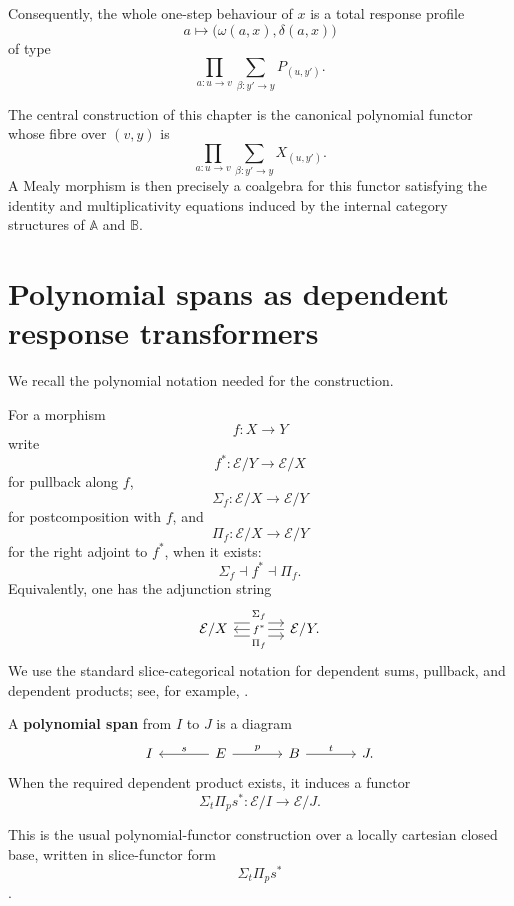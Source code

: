 Consequently, the whole one-step behaviour of \(x\) is a total response
profile
\[
a
\longmapsto
\bigl(\omega(a,x),\delta(a,x)\bigr)
\]
of type
\[
\prod_{a:u\to v}
\sum_{\beta:y'\to y}
P_{(u,y')}.
\]

The central construction of this chapter is the canonical polynomial
functor whose fibre over \((v,y)\) is
\[
\prod_{a:u\to v}
\sum_{\beta:y'\to y}
X_{(u,y')}.
\]
A Mealy morphism is then precisely a coalgebra for this functor satisfying
the identity and multiplicativity equations induced by the internal
category structures of \(\mathbb A\) and \(\mathbb B\).

\section{Polynomial spans as dependent response transformers}
\label{sec:polynomial-spans-dependent-response-transformers}

We recall the polynomial notation needed for the construction.

For a morphism
\[
f:X\to Y
\]
write
\[
f^\ast:\mathcal E/Y\to\mathcal E/X
\]
for pullback along \(f\),
\[
\Sigma_f:\mathcal E/X\to\mathcal E/Y
\]
for postcomposition with \(f\), and
\[
\Pi_f:\mathcal E/X\to\mathcal E/Y
\]
for the right adjoint to \(f^\ast\), when it exists:
\[
\Sigma_f\dashv f^\ast\dashv \Pi_f.
\]
Equivalently, one has the adjunction string
\[
\begin{tikzcd}[column sep=large]
\mathcal E/X
  \arrow[r, shift left=1.1ex, "\Sigma_f"]
  \arrow[r, shift right=1.1ex, swap, "\Pi_f"]
&
\mathcal E/Y
  \arrow[l, "f^\ast" description] .
\end{tikzcd}
\]
We use the standard slice-categorical notation for dependent sums,
pullback, and dependent products; see, for example,
\cite{JacobsCategoricalLogicTypeTheory,GambinoKockPolynomialFunctorsMonads}.

\begin{definition}
\label{def:polynomial-span}
A \textbf{polynomial span} from \(I\) to \(J\) is a diagram
\[
\begin{tikzcd}[column sep=large]
I
&
E
  \arrow[l, "s"']
  \arrow[r, "p"]
&
B
  \arrow[r, "t"]
&
J .
\end{tikzcd}
\]
When the required dependent product exists, it induces a functor
\[
\Sigma_t\Pi_p s^\ast:
\mathcal E/I\to\mathcal E/J.
\]
\end{definition}

This is the usual polynomial-functor construction over a locally
cartesian closed base, written in slice-functor form
\[
\Sigma_t\Pi_p s^\ast
\]
\cite{GambinoKockPolynomialFunctorsMonads}.

